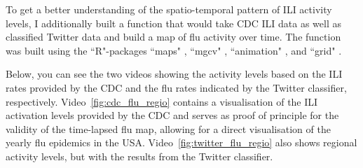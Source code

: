 \documentclass[11pt, a4paper,twoside]{report}\usepackage[]{graphicx}\usepackage[]{color}
\begin{document}
To get a better understanding of the spatio-temporal pattern of ILI activity levels, I additionally built a function that would take CDC ILI data as well as classified Twitter data and build a map of flu activity over time. The function was built using the ``R"-packages ``maps" \citep{maps_2016}, ``mgcv" \citep{mgcv_2006,mgcv_2016}, ``animation" \citep{animation_2015}, and ``grid" \citep{murrell_integrating_2003,murrell_grid_2007,zhou_fun_2010}. 

Below, you can see the two videos showing the activity levels based on the ILI rates provided by the CDC and the flu rates indicated by the Twitter classifier, respectively. Video~\ref{fig:cdc_flu_regio} contains a visualisation of the ILI activation levels provided by the CDC and serves as proof of principle for the validity of the time-lapsed flu map, allowing for a direct visualisation of the yearly flu epidemics in the USA. Video~\ref{fig:twitter_flu_regio} also shows regional activity levels, but with the results from the Twitter classifier. 
\end{document}
